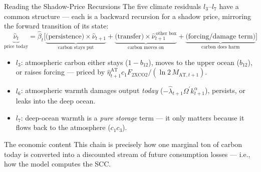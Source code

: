 \documentclass[aspectratio=169,11pt]{beamer}
\newcommand{\emphc}[1]{\textcolor{harvardcrimson}{#1}}
\begin{document}
\begin{frame}{Reading the Shadow-Price Recursions}
\small
The five climate residuals $l_3$--$l_7$ have a common structure --- each is a \emphc{backward recursion} for a shadow price, mirroring the forward transition of its state:
\[
\underbrace{\hat{\nu}_t}_{\text{price today}} = \hat{\beta}_t \Big[ \underbrace{\text{(persistence)} \times \hat{\nu}_{t+1}}_{\text{carbon stays put}} + \underbrace{\text{(transfer)} \times \hat{\nu}^{\,\text{other box}}_{t+1}}_{\text{carbon moves on}} + \underbrace{\text{(forcing/damage term)}}_{\text{carbon does harm}} \Big]
\]

\begin{itemize}
    \item $l_3$: atmospheric carbon either stays ($1-b_{12}$), moves to the upper ocean ($b_{12}$), or raises forcing --- priced by $\hat{\eta}^{\text{AT}}_{t+1} c_1 F_{\text{2XCO2}} / (\ln 2\, M_{\text{AT},t+1})$.
    \item $l_6$: atmospheric warmth damages output \emph{today} ($-\hat{\lambda}_{t+1} \Omega^{\prime} k^{\alpha}_{t+1}$), persists, or leaks into the deep ocean.
    \item $l_7$: deep-ocean warmth is a \emph{pure storage} term --- it only matters because it flows back to the atmosphere ($c_1 c_3$).
\end{itemize}

\begin{block}{The economic content}
This chain is precisely how one marginal ton of carbon today is converted into a discounted stream of future consumption losses --- i.e., how the model computes the SCC.
\end{block}
\end{frame}
\end{document}
